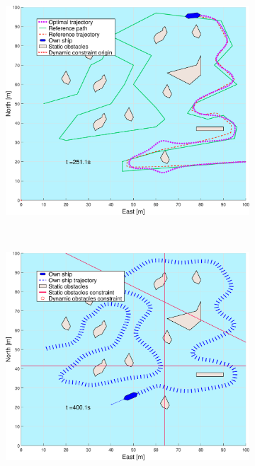 \begin{figure}[!ht]
\begin{subfigure}[b]{0.494\textwidth}
        \subcaption{}
    \end{subfigure}
    \hfill
    \begin{subfigure}[b]{0.494\textwidth}
        \centering
        \includegraphics[width=\textwidth]{Images/Figures/skjergard_u_trafikk/_Simple_0fig999_time=251}
        \subcaption{}
    \end{subfigure}
    \hfill
    \\
    \begin{subfigure}[b]{0.494\textwidth}
        \centering
        \includegraphics[width=\textwidth]{Images/Figures/skjergard_u_trafikk/_Simple_0fig1_time=400}

\end{subfigure}
\end{figure}
